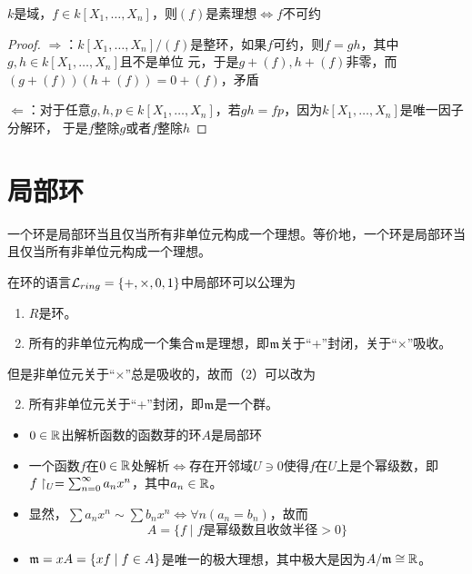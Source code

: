 \documentclass[11pt]{article}
\begin{document}
\begin{corollary}[]
\(k\)是域，\(f\in k[X_1,\dots,X_n]\)，则\((f)\)是素理想\(\Leftrightarrow f\)不可约
\end{corollary}

\begin{proof}
\(\Rightarrow\)：\(k[X_1,\dots,X_n]/(f)\)是整环，如果\(f\)可约，则\(f=gh\)，其中\(g,h\in k[X_1,\dots,X_n]\)且不是单位
元，于是\(g+(f),h+(f)\)非零，而\((g+(f))(h+(f))=0+(f)\)，矛盾

\(\Leftarrow\)：对于任意\(g,h,p\in k[X_1,\dots,X_n]\)，若\(gh=fp\)，因为\(k[X_1,\dots,X_n]\)是唯一因子分解环，
于是\(f\)整除\(g\)或者\(f\)整除\(h\)
\end{proof}
\section{局部环}
\label{sec:orgef8a678}
一个环是局部环当且仅当所有非单位元构成一个理想。等价地，一个环是局部环当且仅当所有非单位元构成一个理想。

在环的语言\(\mathcal{L}_{ring}=\{+,\times,0,1\}\)中局部环可以公理为
\begin{enumerate}
\item \(R\)是环。
\item 所有的非单位元构成一个集合\(\mathfrak{m}\)是理想，即\(\mathfrak{m}\)关于``+''封闭，关于``\(\times\)''吸收。
\end{enumerate}


但是非单位元关于``\(\times\)''总是吸收的，故而（2）可以改为
\begin{enumerate}
\setcounter{enumi}{1}
\item 所有非单位元关于“+”封闭，即\(\mathfrak{m}\)是一个群。
\end{enumerate}

\begin{remark}
\begin{itemize}
\item \(0\in\mathbb{R}\)出解析函数的函数芽的环\(A\)是局部环
\item 一个函数\(f\)在\(0\in\mathbb{R}\)处解析\(\Leftrightarrow\)存在开邻域\(U\ni 0\)使得\(f\)在\(U\)上是个幂级数，即
\(f\upharpoonright_U=\sum_{n=0}^\infty a_nx^n\)，其中\(a_n\in\mathbb{R}\)。
\item 显然，\(\sum a_nx^n\sim\sum b_nx^n\Leftrightarrow\forall n(a_n=b_n)\)，故而
\begin{equation*}
A=\{f\mid f\text{是幂级数且收敛半径}>0\}
\end{equation*}
\item \(\mathfrak{m}=x A=\{xf\mid f\in A\}\)是唯一的极大理想，其中极大是因为\(A/\mathfrak{m}\cong\mathbb{R}\)。
\end{itemize}
\end{remark}
\end{document}
